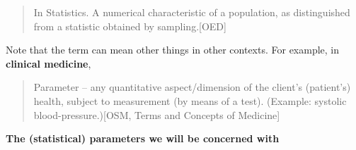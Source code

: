 \documentclass[]{book}
\begin{document}
\begin{quote}
In Statistics. A numerical characteristic of a population, as distinguished from a statistic obtained by sampling.{[}OED{]}
\end{quote}

Note that the term can mean other things in other contexts. For example, in \textbf{clinical medicine},

\begin{quote}
Parameter -- any quantitative aspect/dimension of the client's (patient's) health, subject to measurement (by means of a test). (Example: systolic blood-pressure.){[}OSM, Terms and Concepts of Medicine{]}
\end{quote}

\textbf{The (statistical) parameters we will be concerned with}
\end{document}
